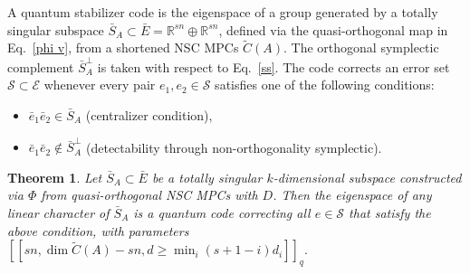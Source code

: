 \documentclass{iopjournal}
\theoremstyle{thmstyleone}%
\newtheorem{theorem}{Theorem}
\theoremstyle{thmstyletwo}%
\theoremstyle{thmstylethree}%
\begin{document}
A quantum stabilizer code is the eigenspace of a group generated by a totally singular subspace $\bar{S}_A \subset \bar{E} = \mathbb{R}^{sn} \oplus \mathbb{R}^{sn}$, defined via the quasi-orthogonal map in Eq.~\eqref{phi v}, from a shortened NSC MPCs $\tilde{C}(A)$. The orthogonal symplectic  complement $\bar{S}_A^\perp$ is taken with respect to Eq.~\eqref{ss}. The code corrects an error set $\mathcal{S} \subset \mathcal{E}$ whenever every pair 
$e_1, e_2 \in \mathcal{S}$ satisfies one of the following conditions:
\begin{itemize}
    \item $\bar{e}_1 \bar{e}_2 \in \bar{S}_A$ (centralizer condition),
    \item $\bar{e}_1 \bar{e}_2 \notin \bar{S}_A^{\perp}$ (detectability through non-orthogonality symplectic).
\end{itemize}
\begin{theorem}\label{theor2}
Let $\bar{S}_A \subset \bar{E}$ be a totally singular $k$-dimensional  subspace constructed via $\Phi$ from quasi-orthogonal NSC MPCs with $D$. Then the eigenspace of any linear character of $\bar{S}_A$ is a quantum code correcting all $e \in \mathcal{S}$ that satisfy the above condition, with parameters
\(
[[sn, \dim \tilde{C}(A) - sn, d \ge \min_i (s+1-i)d_i]]_q.
\)
\end{theorem}
\end{document}
